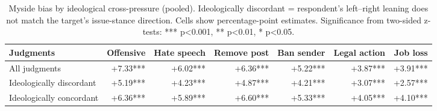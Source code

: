 \begin{table}

\caption{\label{tab:robustness-crosspressure}Myside bias by ideological cross-pressure (pooled). Ideologically discordant = respondent's left--right leaning does not match the target's issue-stance direction. Cells show percentage-point estimates. Significance from two-sided z-tests: *** p<0.001, ** p<0.01, * p<0.05.}
\centering
\begin{tabular}[t]{lrrrrrr}
\toprule
\textbf{Judgments} & \textbf{Offensive} & \textbf{Hate speech} & \textbf{Remove post} & \textbf{Ban sender} & \textbf{Legal action} & \textbf{Job loss}\\
\midrule
All judgments & +7.33*** & +6.02*** & +6.36*** & +5.22*** & +3.87*** & +3.91***\\
Ideologically discordant & +5.19*** & +4.23*** & +4.87*** & +4.21*** & +3.07*** & +2.57***\\
Ideologically concordant & +6.36*** & +5.89*** & +6.60*** & +5.33*** & +4.05*** & +4.10***\\
\bottomrule
\end{tabular}
\end{table}
